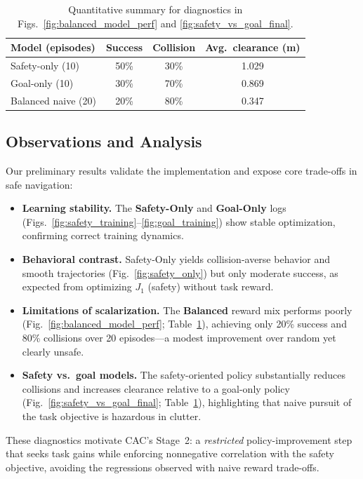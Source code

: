 \documentclass[10pt,conference]{IEEEtran}
\begin{document}
\begin{table}[h!]
\caption{Quantitative summary for diagnostics in Figs.~\ref{fig:balanced_model_perf} and \ref{fig:safety_vs_goal_final}.}
\label{tab:diagnostics_summary}
\centering
\begin{tabular}{@{}lccc@{}}
\toprule
Model (episodes) & Success & Collision & Avg.\ clearance (m) \\
\midrule
Safety-only (10)   & 50\% & 30\% & 1.029 \\
Goal-only (10)     & 30\% & 70\% & 0.869 \\
Balanced naive (20) & 20\% & 80\% & 0.347 \\
\bottomrule
\end{tabular}
\end{table}

\subsection{Observations and Analysis}
Our preliminary results validate the implementation and expose core trade-offs in safe navigation:
\begin{itemize}
    \item \textbf{Learning stability.} The \textbf{Safety-Only} and \textbf{Goal-Only} logs (Figs.~\ref{fig:safety_training}--\ref{fig:goal_training}) show stable optimization, confirming correct training dynamics.
    \item \textbf{Behavioral contrast.} Safety-Only yields collision-averse behavior and smooth trajectories (Fig.~\ref{fig:safety_only}) but only moderate success, as expected from optimizing $J_1$ (safety) without task reward.
    \item \textbf{Limitations of scalarization.} The \textbf{Balanced} reward mix performs poorly (Fig.~\ref{fig:balanced_model_perf}; Table~\ref{tab:diagnostics_summary}), achieving only 20\% success and 80\% collisions over 20 episodes---a modest improvement over random yet clearly unsafe.
    \item \textbf{Safety vs.\ goal models.} The safety-oriented policy substantially reduces collisions and increases clearance relative to a goal-only policy (Fig.~\ref{fig:safety_vs_goal_final}; Table~\ref{tab:diagnostics_summary}), highlighting that naive pursuit of the task objective is hazardous in clutter.
\end{itemize}
These diagnostics motivate CAC’s Stage~2: a \emph{restricted} policy-improvement step that seeks task gains while enforcing nonnegative correlation with the safety objective, avoiding the regressions observed with naive reward trade-offs.
\end{document}
